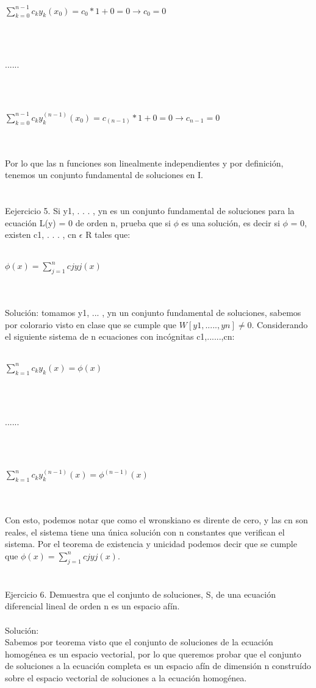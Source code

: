 \documentclass[a4paper,10pt]{article}
\begin{document}
\centerline{$\sum_{k=0}^{n-1} c_k y_k (x_0) = c_0 * 1 + 0 =0 \rightarrow c_0=0$}\\\\
\centerline{......}\\\\
\centerline{$\sum_{k=0}^{n-1} c_k y_k^{(n-1)} (x_0) = c_{(n-1)} * 1 + 0 =0 \rightarrow c_{n-1}=0$}\\\\
Por lo que las n funciones son linealmente independientes y por definición, tenemos un conjunto fundamental de soluciones en I.\\\\\\
Eejercicio 5. Si {y1, . . . , yn} es un conjunto fundamental de soluciones para la ecuación L(y) = 0 de orden n, prueba que si $\phi$ es una solución, es decir si $\phi$ = 0, existen c1, . . . , cn $\epsilon$ R tales que:\\\\
\centerline{$\phi(x) =  \sum_{j=1}^{n} cj yj (x)$}\\\\
Solución: tomamos {y1, ... , yn} un conjunto fundamental de soluciones, sabemos por colorario visto en clase que se cumple que $W[y1, ..... ,yn] \neq 0$. Considerando el siguiente sistema de n ecuaciones con incógnitas c1,......,cn:\\\\
\centerline{$\sum_{k=1}^{n} c_k y_k (x) = \phi (x)$}\\\\
\centerline{......}\\\\
\centerline{$\sum_{k=1}^{n} c_k y_k^{(n-1)} (x) = \phi^{(n-1)} (x)$}\\\\
Con esto, podemos notar que como el wronskiano es dirente de cero, y las cn son reales, el sistema tiene una única solución con n constantes que verifican el sistema. Por el teorema de existencia y unicidad podemos decir que se cumple que $\phi(x) =  \sum_{j=1}^{n} cj yj (x)$.\\\\\\
Ejercicio 6. Demuestra que el conjunto de soluciones, S, de una ecuación diferencial lineal de orden n es un espacio afín.\\\\
Solución:\\
Sabemos por teorema visto que el conjunto de soluciones de la ecuación homogénea es un espacio vectorial, por lo que queremos probar que el conjunto de soluciones a la ecuación completa es un espacio afín de dimensión n construído sobre el espacio vectorial de soluciones a la ecuación homogénea. \\\\\\
\end{document}
